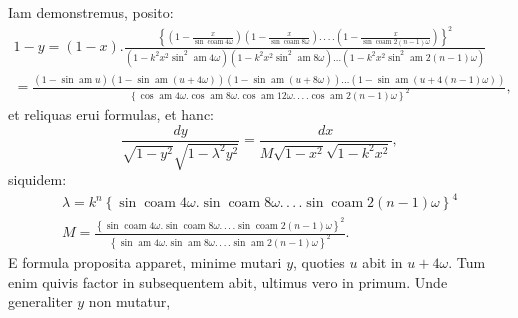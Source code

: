 \documentclass{article}
\begin{document}
Iam demonstremus, posito:
\[
\begin{gathered}
1-y=(1-x).\frac{\left\{\left(1-\frac{x}{\sin\operatorname{coam}4\omega}\right)\left(1-\frac{x}{\sin\operatorname{coam}8\omega}\right).\,.\,.\,.\left(1-\frac{x}{\sin\operatorname{coam}2(n-1)\omega}\right)\right\}^{2}}{\left(1-k^{2}x^{2}\sin^{2}\operatorname{am}4\omega\right)\left(1-k^{2}x^{2}\sin^{2}\operatorname{am}8\omega\right)\ldots\left(1-k^{2}x^{2}\sin^{2}\operatorname{am}2(n-1)\omega\right)}\\[1.5ex]
=\frac{\left(1-\sin\operatorname{am}u\right)\left(1-\sin\operatorname{am}(u+4\omega)\right)\left(1-\sin\operatorname{am}(u+8\omega)\right)\ldots\left(1-\sin\operatorname{am}(u+4(n-1)\omega)\right)}{\left\{\cos\operatorname{am}4\omega.\cos\operatorname{am}8\omega.\cos\operatorname{am}12\omega.\,.\,.\,.\cos\operatorname{am}2(n-1)\omega\right\}^{2}},
\end{gathered}
\]
et reliquas erui formulas, et hanc:
\[
\frac{dy}{\sqrt{1-y^{2}}\sqrt{1-\lambda^{2}y^{2}}}=\frac{dx}{M\sqrt{1-x^{2}}\sqrt{1-k^{2}x^{2}}},
\]
siquidem:
\[
\begin{gathered}
\lambda=k^{n}\left\{\sin\operatorname{coam}4\omega.\sin\operatorname{coam}8\omega.\,.\,.\,.\sin\operatorname{coam}2(n-1)\omega\right\}^{4}\\[1.5ex]
M=\frac{\left\{\sin\operatorname{coam}4\omega.\sin\operatorname{coam}8\omega.\,.\,.\,.\sin\operatorname{coam}2(n-1)\omega\right\}^{2}}{\left\{\sin\operatorname{am}4\omega.\sin\operatorname{am}8\omega.\,.\,.\,.\sin\operatorname{am}2(n-1)\omega\right\}^{2}}.
\end{gathered}
\]
E formula proposita apparet, minime mutari $y$, quoties $u$ abit in $u+4\omega$. Tum enim quivis factor in subsequentem abit, ultimus vero in primum. Unde generaliter $y$ non mutatur,
\end{document}
